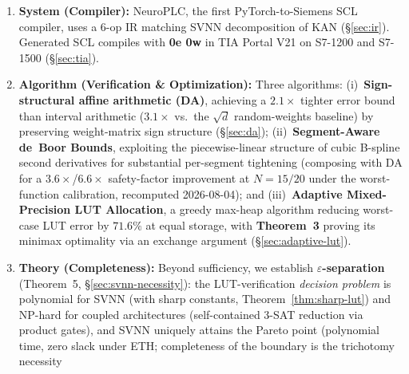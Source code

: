 \documentclass[journal,onecolumn]{IEEEtran}
\newcommand{\neuroplc}{NeuroPLC\xspace}
\begin{document}
\begin{enumerate}
          \textbf{Non-Interference Theorem} (Theorem~\ref{thm:noninterference}) proves that inserting
         a NeuroPLC inference block into a certified PLC program preserves
         all pre-existing safety properties under the timing premise
         $\text{WCET}(P) + \text{WCET}(N) \leq$ scan cycle---to our
         knowledge, the first such guarantee for
         neural-network-on-PLC deployment, directly addressing
         IEC~61508 independence requirements. The \textbf{WCET Theorem} (Theorem~11)
         provides parameterized worst-case execution time bounds
          ($3.86$~ms for KAN $[28,16,4]$, $25.9\times$ scan-cycle margin).
    \item \textbf{System (Compiler):} \neuroplc, the first
         PyTorch-to-Siemens SCL compiler, uses a 6-op IR matching
         SVNN decomposition of KAN ({\S}\ref{sec:ir}). Generated
         SCL compiles with \textbf{0e 0w} in TIA Portal V21
         on S7-1200 and S7-1500 ({\S}\ref{sec:tia}).
    \item \textbf{Algorithm (Verification \& Optimization):} Three
         algorithms: (i)~\textbf{Sign-structural affine arithmetic (DA)},
         achieving a $2.1\times$ tighter error bound than interval arithmetic
          ($3.1\times$ vs.\ the $\sqrt{d}$ random-weights baseline) by preserving
         weight-matrix sign structure ({\S}\ref{sec:da});
          (ii)~\textbf{Segment-Aware de~Boor Bounds}, exploiting the
         piecewise-linear structure of cubic B-spline second derivatives
         for substantial per-segment tightening (composing with DA for a
         $3.6\times$/$6.6\times$ safety-factor improvement at
         $N{=}15/20$ under the worst-function calibration, recomputed
         2026-08-04); and
          (iii)~\textbf{Adaptive Mixed-Precision LUT Allocation}, a greedy
         max-heap algorithm reducing worst-case LUT error by $71.6\%$ at
         equal storage, with \textbf{Theorem~3} proving its minimax optimality
         via an exchange argument ({\S}\ref{sec:adaptive-lut}).
    \item \textbf{Theory (Completeness):} Beyond sufficiency, we establish
          \textbf{$\varepsilon$-separation} (Theorem~5,
          {\S}\ref{sec:svnn-necessity}): the LUT-verification \emph{decision
         problem} is polynomial for SVNN (with sharp constants,
         Theorem~\ref{thm:sharp-lut}) and NP-hard for coupled architectures
         (self-contained 3-SAT reduction via product gates), and SVNN
         uniquely attains the Pareto point (polynomial time, zero slack
         under ETH; completeness of the boundary is the trichotomy necessity

\end{enumerate}
\end{document}
